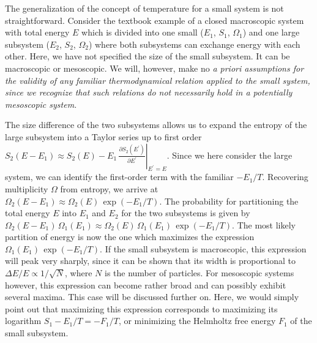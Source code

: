 \documentclass[sort&compress,final,numberedheadings]{aipproc}
\begin{document}
The generalization of the concept of temperature for a small system is not 
straightforward. Consider the textbook example of a closed macroscopic system 
with total energy $E$ which is divided into one small ($E_1$, $S_1$, 
$\Omega_1$) and one large subsystem ($E_2$, $S_2$, $\Omega_2$) where both 
subsystems can exchange energy with each other. Here, we have not specified the
size of the small subsystem. It can be macroscopic or mesoscopic. We will, 
however, make no \em a priori \rm assumptions for the validity of any familiar 
thermodynamical relation applied to the small system, since we recognize that 
such relations do not necessarily hold in a potentially mesoscopic system. 

The size difference of the two subsystems allows us to expand the entropy of 
the large subsystem into a Taylor series up to first order $S_2(E-E_1)\approx 
S_2(E)-E_1\,\left.\frac{\partial S_2(E^\prime)}{\partial E^\prime}
\right|_{E^\prime=E}$. Since we here consider the large system, we can identify
the first-order term with the familiar $-E_1/T$. Recovering multiplicity 
$\Omega$ from entropy, we arrive at 
$\Omega_2(E-E_1)\approx\Omega_2(E)\,\exp(-E_1/T)$. The probability for 
partitioning the total energy $E$ into $E_1$ and $E_2$ for the two subsystems 
is given by $\Omega_2(E-E_1)\,\Omega_1(E_1)\approx\Omega_2(E)\,\Omega_1(E_1)\,
\exp(-E_1/T)$. The most likely partition of energy is now the one which 
maximizes the expression $\Omega_1(E_1)\,\exp(-E_1/T)$. If the small subsystem 
is macroscopic, this expression will peak very sharply, since it can be shown 
that its width is proportional to $\Delta E/E\propto 1/\sqrt{N}$, where $N$ is 
the number of particles. For mesoscopic systems however, this expression can 
become rather broad and can possibly exhibit several maxima. This case will be 
discussed further on. Here, we would simply point out that maximizing this 
expression corresponds to maximizing its logarithm $S_1-E_1/T=-F_1/T$, or 
minimizing the Helmholtz free energy $F_1$ of the small subsystem. 
\end{document}
